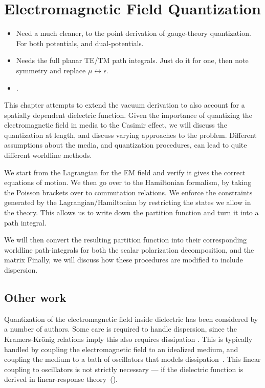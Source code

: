\chapter{Electromagnetic Field Quantization}

\label{ch:EM_quantization}

\begin{itemize}
  \item {}
    Need a much cleaner, to the point derivation of gauge-theory quantization.
    For both potentials, and dual-potentials.
  \item {} Needs the full planar TE/TM path integrals.  
    Just do it for one, then note symmetry and replace $\mu\leftrightarrow\epsilon$.
  \item {}.
\end{itemize}


This chapter attempts to extend the vacuum derivation to also account for a spatially dependent dielectric function.
Given the importance of quantizing the electromagnetic field in media to the Casimir effect,
we will discuss the quantization at length, and discuss varying approaches to the problem.  
Different assumptions about the media, and quantization procedures, can lead to quite different 
worldline methods.

  We start from the Lagrangian for the EM field and verify it gives the correct equations of motion.
  We then go over to the Hamiltonian formalism, by taking the Poisson brackets over to commutation relations.
  We enforce the constraints generated by the Lagrangian/Hamiltonian by restricting the states we allow in the theory.
  This allows us to write down the partition function and turn it into a path integral. 
  
  We will then convert the resulting partition function into their corresponding worldline path-integrals
  for both the scalar polarization decomposition, and the matrix 
  Finally, we will discuss how these procedures are modified to include dispersion.  

\section{Other work}
Quantization of the electromagnetic field inside dielectric has been considered
 by a number of authors.  
Some care is required to handle dispersion, since the Kramers-Kr\"onig relations
 imply this also requires dissipation .  
This is typically handled by coupling the electromagnetic field to an idealized
 medium, and coupling the medium to a bath of oscillators that models
 dissipation~\cite{Huttner1992,Dung1998}.  This linear coupling to oscillators is not 
strictly necessary --- if the dielectric function is derived in linear-response theory~(\cite{Rahi2009}).

